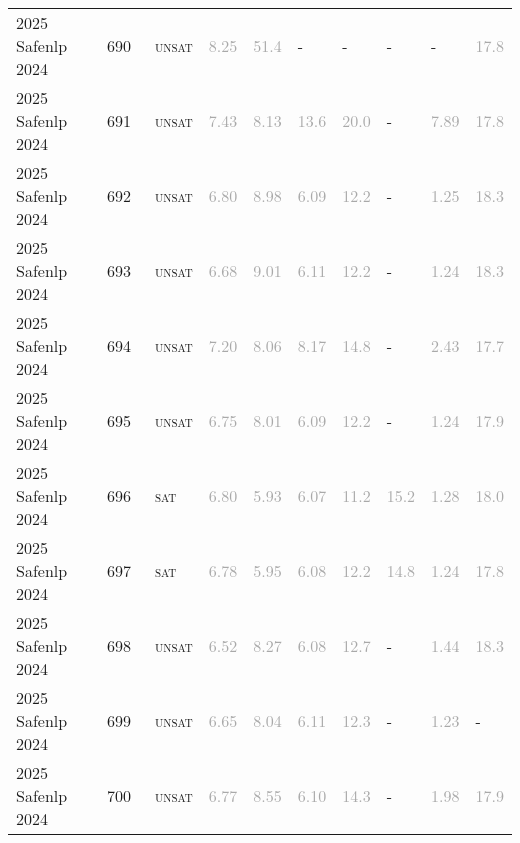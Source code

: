 \begin{center}
{\begin{longtable}{@{}llllllllll@{}}
2025 Safenlp 2024 & 690 & ~\textsc{unsat} & \textcolor{darkgray}{8.25} & \textcolor{darkgray}{51.4} & - & - & - & - & \textcolor{darkgray}{17.8} \\
2025 Safenlp 2024 & 691 & ~\textsc{unsat} & \textcolor{darkgray}{7.43} & \textcolor{darkgray}{8.13} & \textcolor{darkgray}{13.6} & \textcolor{darkgray}{20.0} & - & \textcolor{darkgray}{7.89} & \textcolor{darkgray}{17.8} \\
2025 Safenlp 2024 & 692 & ~\textsc{unsat} & \textcolor{darkgray}{6.80} & \textcolor{darkgray}{8.98} & \textcolor{darkgray}{6.09} & \textcolor{darkgray}{12.2} & - & \textcolor{darkgray}{1.25} & \textcolor{darkgray}{18.3} \\
2025 Safenlp 2024 & 693 & ~\textsc{unsat} & \textcolor{darkgray}{6.68} & \textcolor{darkgray}{9.01} & \textcolor{darkgray}{6.11} & \textcolor{darkgray}{12.2} & - & \textcolor{darkgray}{1.24} & \textcolor{darkgray}{18.3} \\
2025 Safenlp 2024 & 694 & ~\textsc{unsat} & \textcolor{darkgray}{7.20} & \textcolor{darkgray}{8.06} & \textcolor{darkgray}{8.17} & \textcolor{darkgray}{14.8} & - & \textcolor{darkgray}{2.43} & \textcolor{darkgray}{17.7} \\
2025 Safenlp 2024 & 695 & ~\textsc{unsat} & \textcolor{darkgray}{6.75} & \textcolor{darkgray}{8.01} & \textcolor{darkgray}{6.09} & \textcolor{darkgray}{12.2} & - & \textcolor{darkgray}{1.24} & \textcolor{darkgray}{17.9} \\
2025 Safenlp 2024 & 696 & ~\textsc{sat} & \textcolor{darkgray}{6.80} & \textcolor{darkgray}{5.93} & \textcolor{darkgray}{6.07} & \textcolor{darkgray}{11.2} & \textcolor{darkgray}{15.2} & \textcolor{darkgray}{1.28} & \textcolor{darkgray}{18.0} \\
2025 Safenlp 2024 & 697 & ~\textsc{sat} & \textcolor{darkgray}{6.78} & \textcolor{darkgray}{5.95} & \textcolor{darkgray}{6.08} & \textcolor{darkgray}{12.2} & \textcolor{darkgray}{14.8} & \textcolor{darkgray}{1.24} & \textcolor{darkgray}{17.8} \\
2025 Safenlp 2024 & 698 & ~\textsc{unsat} & \textcolor{darkgray}{6.52} & \textcolor{darkgray}{8.27} & \textcolor{darkgray}{6.08} & \textcolor{darkgray}{12.7} & - & \textcolor{darkgray}{1.44} & \textcolor{darkgray}{18.3} \\
2025 Safenlp 2024 & 699 & ~\textsc{unsat} & \textcolor{darkgray}{6.65} & \textcolor{darkgray}{8.04} & \textcolor{darkgray}{6.11} & \textcolor{darkgray}{12.3} & - & \textcolor{darkgray}{1.23} & - \\
2025 Safenlp 2024 & 700 & ~\textsc{unsat} & \textcolor{darkgray}{6.77} & \textcolor{darkgray}{8.55} & \textcolor{darkgray}{6.10} & \textcolor{darkgray}{14.3} & - & \textcolor{darkgray}{1.98} & \textcolor{darkgray}{17.9} \\

\end{longtable}}
\end{center}
